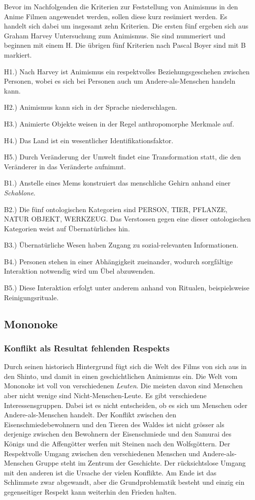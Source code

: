 Bevor im Nachfolgenden die Kriterien zur Feststellung von Animismus in den Anime Filmen angewendet werden, sollen diese kurz resümiert werden. Es handelt sich dabei um insgesamt zehn Kriterien. Die ersten fünf ergeben sich aus Graham Harvey Untersuchung zum Animismus. Sie sind nummeriert und beginnen mit einem H. Die übrigen fünf Kriterien nach Pascal Boyer sind mit B markiert.

H1.) Nach Harvey ist Animismus ein respektvolles Beziehungsgeschehen zwischen Personen, wobei es sich bei Personen auch um Andere-als-Menschen handeln kann.

H2.) Animismus kann sich in der Sprache niederschlagen.

H3.) Animierte Objekte weisen in der Regel anthropomorphe Merkmale auf.

H4.) Das Land ist ein wesentlicher Identifikationsfaktor.

H5.) Durch Veränderung der Umwelt findet eine Transformation statt, die den Veränderer in das Veränderte aufnimmt.

B1.) Anstelle eines Mems konstruiert das menschliche Gehirn anhand einer \emph{Schablone}.

B2.) Die fünf ontologischen Kategorien sind PERSON, TIER, PFLANZE, NATUR OBJEKT, WERKZEUG. Das Verstossen gegen eine dieser ontologischen Kategorien weist auf Übernatürliches hin.

B3.) Übernatürliche Wesen haben Zugang zu sozial-relevanten Informationen. 

B4.) Personen stehen in einer Abhängigkeit zueinander, wodurch sorgfältige Interaktion notwendig wird um Übel abzuwenden.

B5.) Diese Interaktion erfolgt unter anderem anhand von Ritualen, beispielsweise Reinigungsrituale.

\subsection{Mononoke} 
\subsubsection{Konflikt als Resultat fehlenden Respekts} 
Durch seinen historisch Hintergrund fügt sich die Welt des Films von sich aus in den Shinto, und damit in einen geschichtlichen Animismus ein. Die Welt vom Mononoke ist voll von verschiedenen \emph{Leuten}. Die meisten davon sind Menschen aber nicht wenige sind Nicht-Menschen-Leute. Es gibt verschiedene Interessensgruppen. Dabei ist es nicht entscheiden, ob es sich um Menschen oder Andere-als-Menschen handelt. Der Konflikt zwischen den Eisenschmiedebewohnern und den Tieren des Waldes ist nicht grösser als derjenige zwischen den Bewohnern der Eisenschmiede und den Samurai des Königs und die Affengötter werfen mit Steinen nach den Wolfsgöttern. Der Respektvolle Umgang zwischen den verschiedenen Menschen und Andere-als-Menschen Gruppe steht im Zentrum der Geschichte. Der rücksichtslose Umgang mit den anderen ist die Ursache der vielen Konflikte. Am Ende ist das Schlimmste zwar abgewandt, aber die Grundproblematik besteht und einzig ein gegenseitiger Respekt kann weiterhin den Frieden halten. 
 
